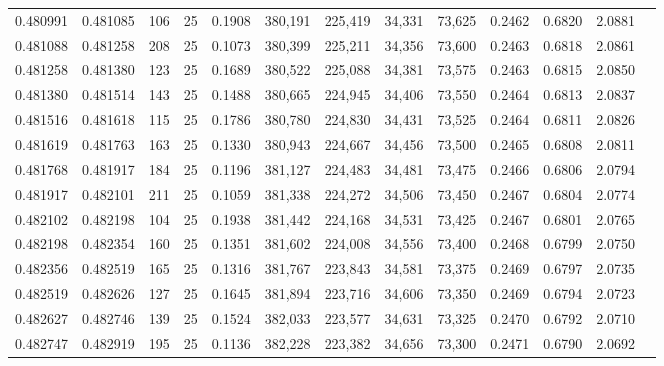 \begin{tabular}{rrrrrrrrrrrrr}
0.480991 & 0.481085 &   106 &  25 &                                     0.1908 & 380,191 & 225,419 &  34,331 &  73,625 & 0.2462 & 0.6820 & 2.0881 \\
0.481088 & 0.481258 &   208 &  25 &                                     0.1073 & 380,399 & 225,211 &  34,356 &  73,600 & 0.2463 & 0.6818 & 2.0861 \\
0.481258 & 0.481380 &   123 &  25 &                                     0.1689 & 380,522 & 225,088 &  34,381 &  73,575 & 0.2463 & 0.6815 & 2.0850 \\
0.481380 & 0.481514 &   143 &  25 &                                     0.1488 & 380,665 & 224,945 &  34,406 &  73,550 & 0.2464 & 0.6813 & 2.0837 \\
0.481516 & 0.481618 &   115 &  25 &                                     0.1786 & 380,780 & 224,830 &  34,431 &  73,525 & 0.2464 & 0.6811 & 2.0826 \\
0.481619 & 0.481763 &   163 &  25 &                                     0.1330 & 380,943 & 224,667 &  34,456 &  73,500 & 0.2465 & 0.6808 & 2.0811 \\
0.481768 & 0.481917 &   184 &  25 &                                     0.1196 & 381,127 & 224,483 &  34,481 &  73,475 & 0.2466 & 0.6806 & 2.0794 \\
0.481917 & 0.482101 &   211 &  25 &                                     0.1059 & 381,338 & 224,272 &  34,506 &  73,450 & 0.2467 & 0.6804 & 2.0774 \\
0.482102 & 0.482198 &   104 &  25 &                                     0.1938 & 381,442 & 224,168 &  34,531 &  73,425 & 0.2467 & 0.6801 & 2.0765 \\
0.482198 & 0.482354 &   160 &  25 &                                     0.1351 & 381,602 & 224,008 &  34,556 &  73,400 & 0.2468 & 0.6799 & 2.0750 \\
0.482356 & 0.482519 &   165 &  25 &                                     0.1316 & 381,767 & 223,843 &  34,581 &  73,375 & 0.2469 & 0.6797 & 2.0735 \\
0.482519 & 0.482626 &   127 &  25 &                                     0.1645 & 381,894 & 223,716 &  34,606 &  73,350 & 0.2469 & 0.6794 & 2.0723 \\
0.482627 & 0.482746 &   139 &  25 &                                     0.1524 & 382,033 & 223,577 &  34,631 &  73,325 & 0.2470 & 0.6792 & 2.0710 \\
0.482747 & 0.482919 &   195 &  25 &                                     0.1136 & 382,228 & 223,382 &  34,656 &  73,300 & 0.2471 & 0.6790 & 2.0692 \\

\end{tabular}
